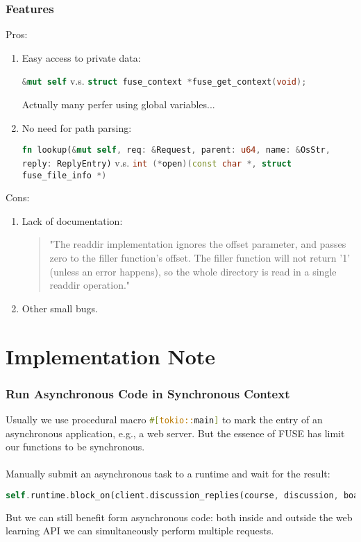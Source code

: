 \documentclass[usenames,xcolor=svgnames,11pt,sans]{beamer}
\begin{document}
\begin{frame}[fragile]
\frametitle{Features}

Pros:

\begin{enumerate}
  \pause \item Easy access to private data:
  
  \lstinline[language = Rust]|&mut self| v.s. \lstinline[language=C++]|struct fuse_context *fuse_get_context(void);|
  
  Actually many perfer using global variables...
  
  \pause \item No need for path parsing:
  
  \lstinline[language = Rust,  basicstyle = \fontsize{6}{6}\ttfamily\color{BlackText}]|fn lookup(&mut self, req: &Request, parent: u64, name: &OsStr, reply: ReplyEntry)| v.s. \lstinline[language=C++, basicstyle = \fontsize{6}{6}\ttfamily\color{BlackText}]|int (*open)(const char *, struct fuse_file_info *)|
\end{enumerate}

\pause Cons:

\begin{enumerate}
  \pause \item Lack of documentation:
  
  \begin{quote}
"The readdir implementation ignores the offset parameter, and passes zero to the filler function's offset. The filler function will not return '1' (unless an error happens), so the whole directory is read in a single readdir operation."
  \end{quote}
  
  \pause \item Other small bugs.
\end{enumerate}
\end{frame}

\section{Implementation Note}

\begin{frame}[fragile]
\frametitle{Run Asynchronous Code in Synchronous Context}
Usually we use procedural macro \lstinline[language=Rust]|#[tokio::main]| to mark the entry of an asynchronous application, e.g., a web server. But the essence of FUSE has limit our functions to be synchronous.
\pause ~\\~\\
Manually submit an asynchronous task to a runtime and wait for the result:

\begin{lstlisting}[language=Rust, basicstyle = \fontsize{8}{8}\ttfamily\color{BlackText}]
self.runtime.block_on(client.discussion_replies(course, discussion, board))
\end{lstlisting}
\pause
But we can still benefit form asynchronous code: both inside and outside the web learning API we can simultaneously perform multiple requests.
\end{frame}
\end{document}
